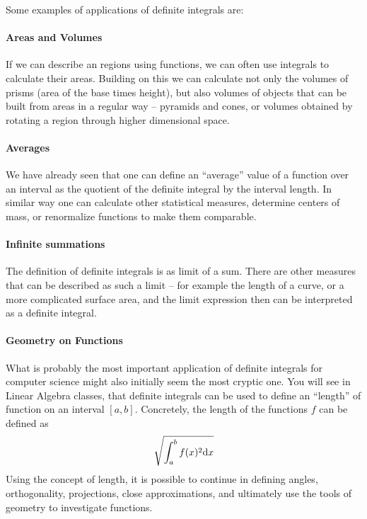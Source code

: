 Some examples of applications of definite integrals are:
\paragraph{Areas and Volumes}
If we can describe an regions using functions, we can often use integrals to calculate their areas. Building on this we can calculate not
only the volumes of prisms (area of the base times height), but also volumes of objects that can be built from areas in a regular way --
pyramids and cones, or volumes obtained by rotating a region through higher dimensional space.
\paragraph{Averages}
We have already seen that one can define an ``average'' value of a function over an interval as the quotient of the definite integral by
the interval length. In similar way one can calculate other statistical measures, determine centers of mass, or renormalize functions to
make them comparable.
\paragraph{Infinite summations}
The definition of definite integrals is as limit of a sum. There are other measures that can be described as such a limit -- for example
the length of a curve, or a more complicated surface area, and the limit expression then can be interpreted as a definite integral.
\paragraph{Geometry on Functions}
What is probably the most important application of definite integrals for
computer science might also initially seem the most cryptic one. You will see
in Linear Algebra classes, that definite integrals can be used to define an
``length'' of function on an interval $[a,b]$. Concretely, the length of
the functions $f$ can be defined as
\[
\sqrt{
\int_a^b f(x)^2{\mbox{d}}x}
\]
Using the concept of length, it is possible to continue in defining angles,
orthogonality, projections, close approximations, and ultimately use the
tools of geometry to investigate functions.


